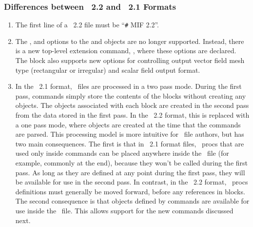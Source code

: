 \subsubsection{Differences between \MIF~2.2 and \MIF~2.1 Formats}\label{sec:mif22diffs}
\begin{enumerate}
\item The first line of a \MIF~2.2 file must be ``\verb+#+ MIF 2.2''.
\item The ,  and
  options to the 
 and  objects are no longer supported.  Instead,
 there is a new top-level extension command, , where
 these options are declared.  The  block also
 supports new options for controlling output vector field mesh type
 (rectangular or irregular) and scalar field output format.
\item In the \MIF~2.1 format, \MIF\ files are
 processed in a two pass mode.  During the first pass, 
 commands simply store the contents of the  blocks without
 creating any  objects.  The  objects
 associated with each  block are created in the second pass
 from the data stored in the first pass.  In the \MIF~2.2 format, this is
 replaced with a one pass mode, where  objects are created
 at the time that the  commands are parsed.  This processing
 model is more intuitive for \MIF\ file authors, but has two main
 consequences.  The first is that in \MIF~2.1 format files, \Tcl\ procs that
 are used only inside  commands can be placed anywhere inside
 the \MIF\ file (for example, commonly at the end), because they won't be
 called during the first pass.  As long as they are defined at any point
 during the first pass, they will be available for use in the second
 pass.  In contrast, in the \MIF~2.2 format, \Tcl\ procs definitions must
 generally be moved forward, before any references in 
 blocks.  The second consequence is that  objects defined by
  commands are available for use inside the \MIF\ file.  This
 allows support for the new commands discussed next.
\end{enumerate}

